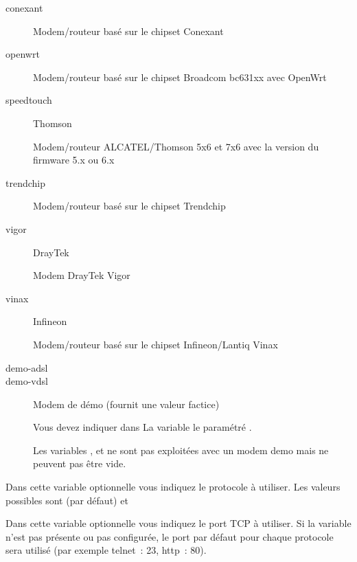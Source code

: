 \begin{description}
\begin{description}
\item[conexant] 

  Modem/routeur basé sur le chipset Conexant
  
\item[openwrt] 

  Modem/routeur basé sur le chipset Broadcom bc631xx avec OpenWrt  

\item[speedtouch] Thomson 

  Modem/routeur ALCATEL/Thomson 5x6 et 7x6 avec la version du firmware 5.x ou 6.x

\item[trendchip] 

  Modem/routeur basé sur le chipset Trendchip

\item[vigor] DrayTek 

  Modem DrayTek Vigor

\item[vinax] Infineon 

  Modem/routeur basé sur le chipset Infineon/Lantiq Vinax

\item[demo-adsl]
\item[demo-vdsl] Modem de démo (fournit une valeur factice)

  Vous devez indiquer dans La variable 
  le paramétré .

  Les variables ,
   et
   ne sont pas exploitées avec
  un modem demo mais ne peuvent pas être vide.

\end{description}


  Dans cette variable optionnelle vous indiquez le protocole à utiliser.
  Les valeurs possibles sont  (par défaut) et 


  Dans cette variable optionnelle vous indiquez le port TCP à utiliser.
  Si la variable n'est pas présente ou pas configurée, le port par défaut
  pour chaque protocole sera utilisé (par exemple telnet~: 23, http~: 80).


\end{description}
